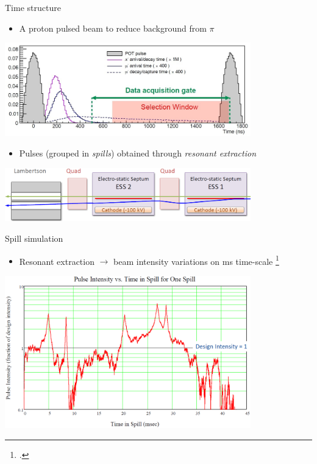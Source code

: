 \documentclass[10pt]{beamer}
\begin{document}
%
\begin{frame}{Time structure}
\centering
\begin{itemize}
\item A proton pulsed beam to reduce background from $\pi$
\end{itemize}
\includegraphics[width=0.8\textwidth]{mu2e_event}
\begin{itemize}
\item Pulses (grouped in \textit{spills}) obtained through \textit{resonant extraction}
\end{itemize}
\includegraphics[width=0.8\textwidth]{Extraction}
\end{frame}

%
\begin{frame}{Spill simulation}
\begin{itemize}
\item Resonant extraction $\rightarrow$ beam intensity variations on ms time-scale \footcite{SpillSim}\\
\end{itemize}
\begin{center}
\includegraphics[width=0.8\textwidth]{POT_sim}
\end{center}
\end{frame}
\end{document}
